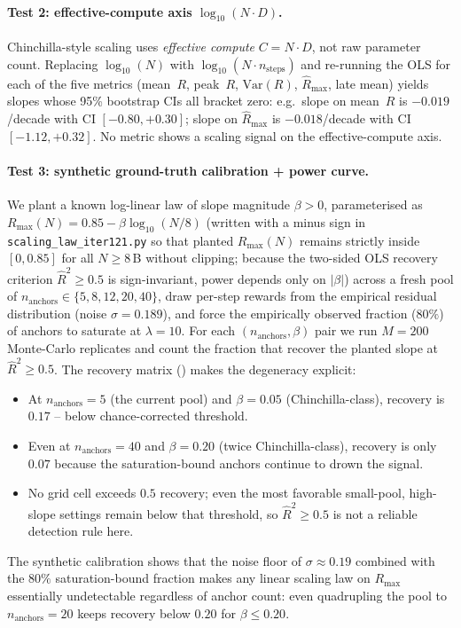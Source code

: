 \paragraph{Test 2: effective-compute axis $\log_{10}(N \cdot D)$.}
\label{par:scaling-iter121-effcomp}
Chinchilla-style scaling uses \emph{effective compute}
$C = N \cdot D$, not raw parameter count.  Replacing $\log_{10}(N)$
with $\log_{10}(N \cdot n_{\text{steps}})$ and re-running the OLS
for each of the five metrics (mean~$R$, peak~$R$, $\mathrm{Var}(R)$,
$\hat R_{\max}$, late mean) yields slopes whose 95\% bootstrap CIs
all bracket zero: e.g.\ slope on mean~$R$ is $-0.019$/decade with
CI $[-0.80, +0.30]$; slope on $\hat R_{\max}$ is $-0.018$/decade
with CI $[-1.12, +0.32]$.  No metric shows a scaling signal on the
effective-compute axis.

\paragraph{Test 3: synthetic ground-truth calibration + power curve.}
\label{par:scaling-iter121-power}
We plant a known log-linear law of slope magnitude $\beta > 0$,
parameterised as $R_{\max}(N) = 0.85 - \beta \log_{10}(N/8)$
(written with a minus sign in \texttt{scaling\_law\_iter121.py} so
that planted $R_{\max}(N)$ remains strictly inside $[0, 0.85]$ for
all $N \ge 8$\,B without clipping; because the two-sided OLS
recovery criterion $\hat R^2 \ge 0.5$ is sign-invariant, power
depends only on $|\beta|$)
across a fresh pool of $n_{\text{anchors}} \in \{5,8,12,20,40\}$,
draw per-step rewards from the empirical residual distribution
(noise $\sigma = 0.189$), and force the empirically observed
fraction ($80\%$) of anchors to saturate at $\lambda = 10$.  For each
$(n_{\text{anchors}}, \beta)$ pair we run $M = 200$ Monte-Carlo
replicates and count the fraction that recover the planted slope
at $\hat R^2 \ge 0.5$.  The recovery matrix
() makes the degeneracy
explicit:
\begin{itemize}
  \item At $n_{\text{anchors}} = 5$ (the current pool) and
    $\beta = 0.05$ (Chinchilla-class), recovery is $0.17$ -- below
    chance-corrected threshold.
  \item Even at $n_{\text{anchors}} = 40$ and $\beta = 0.20$ (twice
    Chinchilla-class), recovery is only $0.07$ because the
    saturation-bound anchors continue to drown the signal.
  \item No grid cell exceeds $0.5$ recovery; even the most favorable
    small-pool, high-slope settings remain below that threshold, so
    $\hat R^2 \ge 0.5$ is not a reliable detection rule here.
\end{itemize}
The synthetic calibration shows that the noise floor of
$\sigma \approx 0.19$ combined with the $80\%$ saturation-bound
fraction makes any linear scaling law on $R_{\max}$ essentially
undetectable regardless of anchor count: even quadrupling the pool
to $n_{\text{anchors}} = 20$ keeps recovery below $0.20$ for
$\beta \le 0.20$.

